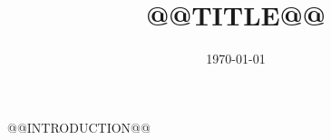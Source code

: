 \documentclass{beamer}
\title{@@TITLE@@}
\author{}
\date{\today}
\begin{document}
\frame{\titlepage}

\begin{frame}{@@INTRODUCTION@@}

\end{frame}
\end{document}
